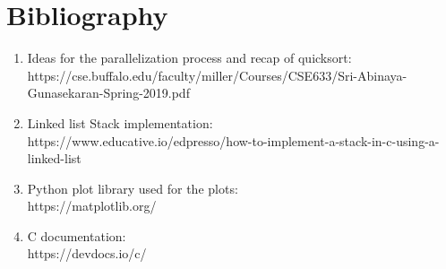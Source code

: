 \documentclass{article}
\begin{document}
\section{Bibliography}
\begin{enumerate}
    \item Ideas for the parallelization process and recap of quicksort:\\
    https://cse.buffalo.edu/faculty/miller/Courses/CSE633/Sri-Abinaya-Gunasekaran-Spring-2019.pdf
    \item Linked list Stack implementation:\\
    https://www.educative.io/edpresso/how-to-implement-a-stack-in-c-using-a-linked-list
    \item Python plot library used for the plots:\\
    https://matplotlib.org/
    \item C documentation:\\
    https://devdocs.io/c/
\end{enumerate}
\end{document}
